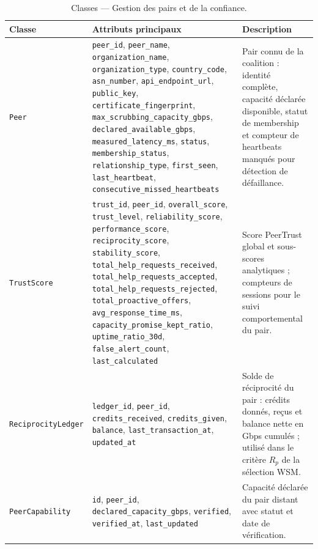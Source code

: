 \begin{longtable}{|
>{\raggedright\arraybackslash}p{4.0cm}|
>{\raggedright\arraybackslash}p{6.2cm}|
>{\raggedright\arraybackslash}p{4.0cm}|}

\caption{Classes — Gestion des pairs et de la confiance.}
\label{tab:classes_peers}
\\
\hline

\textbf{Classe} &
\textbf{Attributs principaux} &
\textbf{Description} \\
\hline
\endfirsthead

\hline
\endlastfoot

\texttt{Peer} &
\texttt{peer\_id}, \texttt{peer\_name}, \texttt{organization\_name}, \texttt{organization\_type}, \texttt{country\_code}, \texttt{asn\_number}, \texttt{api\_endpoint\_url}, \texttt{public\_key}, \texttt{certificate\_fingerprint}, \texttt{max\_scrubbing\_capacity\_gbps}, \texttt{declared\_available\_gbps}, \texttt{measured\_latency\_ms}, \texttt{status}, \texttt{membership\_status}, \texttt{relationship\_type}, \texttt{first\_seen}, \texttt{last\_heartbeat}, \texttt{consecutive\_missed\_heartbeats} &
Pair connu de la coalition : identité complète, capacité déclarée disponible, statut de membership et compteur de heartbeats manqués pour détection de défaillance. \\
\hline

\texttt{TrustScore} &
\texttt{trust\_id}, \texttt{peer\_id}, \texttt{overall\_score}, \texttt{trust\_level}, \texttt{reliability\_score}, \texttt{performance\_score}, \texttt{reciprocity\_score}, \texttt{stability\_score}, \texttt{total\_help\_requests\_received}, \texttt{total\_help\_requests\_accepted}, \texttt{total\_help\_requests\_rejected}, \texttt{total\_proactive\_offers}, \texttt{avg\_response\_time\_ms}, \texttt{capacity\_promise\_kept\_ratio}, \texttt{uptime\_ratio\_30d}, \texttt{false\_alert\_count}, \texttt{last\_calculated} &
Score PeerTrust global et sous-scores analytiques ; compteurs de sessions pour le suivi comportemental du pair. \\
\hline

\texttt{ReciprocityLedger} &
\texttt{ledger\_id}, \texttt{peer\_id}, \texttt{credits\_received}, \texttt{credits\_given}, \texttt{balance}, \texttt{last\_transaction\_at}, \texttt{updated\_at} &
Solde de réciprocité du pair : crédits donnés, reçus et balance nette en Gbps cumulés ; utilisé dans le critère $R_p$ de la sélection WSM. \\
\hline

\texttt{PeerCapability} &
\texttt{id}, \texttt{peer\_id}, \texttt{declared\_capacity\_gbps}, \texttt{verified}, \texttt{verified\_at}, \texttt{last\_updated} &
Capacité déclarée du pair distant avec statut et date de vérification. \\
\hline


\end{longtable}
